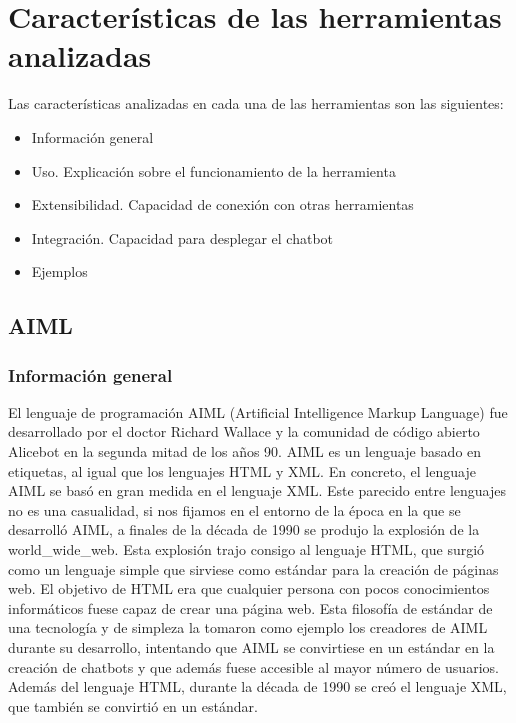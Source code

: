 \chapter{Características de las herramientas analizadas} 

\label{carac_herramientas_anali}

Las características analizadas en cada una de las herramientas son las siguientes:

\begin{itemize}
\item Información general
\item Uso. Explicación sobre el funcionamiento de la herramienta
\item Extensibilidad. Capacidad de conexión con otras herramientas
\item Integración. Capacidad para desplegar el chatbot
\item Ejemplos
\end{itemize}


\section{AIML}

\subsection*{Información general}

El lenguaje de programación AIML (Artificial Intelligence Markup Language) fue desarrollado por el doctor Richard Wallace y la comunidad de código abierto Alicebot en la segunda mitad de los años 90. AIML es un lenguaje basado en etiquetas, al igual que los lenguajes HTML y XML. En concreto, el lenguaje AIML se basó en gran medida en el lenguaje XML. Este parecido entre lenguajes no es una casualidad, si nos fijamos en el entorno de la época en la que se desarrolló AIML, a finales de la década de 1990 se produjo la explosión de la \gls{world_wide_web}. Esta explosión trajo consigo al lenguaje HTML, que surgió como un lenguaje simple que sirviese como estándar para la creación de páginas web. El objetivo de HTML era que cualquier persona con pocos conocimientos informáticos fuese capaz de crear una página web. Esta filosofía de estándar de una tecnología y de simpleza la tomaron como ejemplo los creadores de AIML durante su desarrollo, intentando que AIML se convirtiese en un estándar en la creación de chatbots y que además fuese accesible al mayor número de usuarios. Además del lenguaje HTML, durante la década de 1990 se creó el lenguaje XML, que también se convirtió en un estándar.

